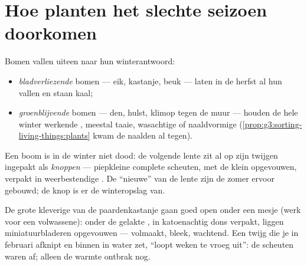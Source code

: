 \section{Hoe planten het slechte seizoen doorkomen}

\begin{definition}\label{def:g6:life-through-seasons:trees}
Bomen vallen uiteen naar hun winterantwoord:
\begin{itemize}
  \item \emph{bladverliezende} bomen --- eik,
        kastanje, beuk --- laten in de herfst al hun  vallen en
        staan kaal;
  \item \emph{groenblijvende} bomen --- den, hulst,
        klimop tegen de muur --- houden de hele winter werkende ,
        meestal taaie, wasachtige of naaldvormige
        (\cref{prop:g3:sorting-living-things:plants} kwam de naalden al
        tegen).
\end{itemize}
\end{definition}

\begin{definition}[Knoppen]\label{def:g6:life-through-seasons:buds}
Een  boom is in de winter niet dood: de volgende lente zit
al op zijn twijgen ingepakt als \emph{knoppen} ---
piepkleine complete scheuten, met de  klein opgevouwen, verpakt
in weerbestendige . De ``nieuwe''  van de lente zijn de
zomer ervoor gebouwd; de knop is er de winteropslag van.
\end{definition}

\begin{example}\label{ex:g6:life-through-seasons:bud}
De grote kleverige  van de paardenkastanje gaan goed open onder
een mesje (werk voor een volwassene): onder de gelakte , in
katoenachtig dons verpakt, liggen miniatuurbladeren opgevouwen ---
volmaakt, bleek, wachtend. Een twijg die je in februari afknipt en
binnen in water zet, ``loopt weken te vroeg uit'': de scheuten waren af;
alleen de warmte ontbrak nog.
\end{example}

